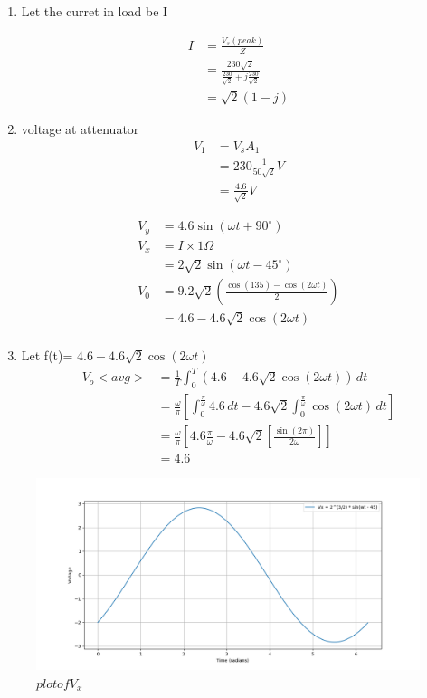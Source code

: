 \documentclass[journal,12pt,twocolumn]{IEEEtran}
\theoremstyle{remark}
\begin{document}

\begin{enumerate}
    \item 

Let the curret in load be I

\begin{center}
\begin{align}
     I &=\frac{V_s(peak)}{Z}\\
     &=\frac{230\sqrt{2}}{\frac{230}{\sqrt{2}}+j\frac{230}{\sqrt{2}}} \\
     &=\sqrt{2}(1-j)
\end{align}
\end{center}
\item
voltage at attenuator 
\begin{align}
    V_1&=V_sA_1\\
    &=230\frac{1}{50\sqrt{2}}V\\
    &=\frac{4.6}{\sqrt{2}}V
\end{align}

\begin{center}
    \begin{align}
        V_y&=4.6\sin(\omega t+90^\circ)\\
        V_x&=I\times 1\Omega\\
        &=2\sqrt{2}\sin(\omega t-45^\circ)\\
        V_0&=9.2\sqrt{2}(\frac{\cos(135)-\cos(2\omega t)}{2})\\
        &=4.6-4.6\sqrt{2}\cos(2\omega t)\\
    \end{align}
\end{center}

\item 
Let f(t)= $4.6-4.6\sqrt{2}\cos(2\omega t)$
\begin{align}
    V_o<avg>&=\frac{1}{T}\int_{0}^{T}(4.6-4.6\sqrt{2}\cos(2\omega t))\,dt\\
    &=\frac{\omega}{\pi} \left[\int_{0}^{\frac{\pi}{\omega}}4.6\,dt-4.6\sqrt{2}\int_{0}^{\frac{\pi}{\omega}}\cos(2\omega t)\,dt\right]\\
    &=\frac{\omega}{\pi}\left[4.6\frac{\pi}{\omega}-4.6\sqrt{2}\left[\frac{\sin(2\pi )}{2\omega}\right]\right]\\
    &=4.6
\end{align}
\end{enumerate}
\begin{figure}[h]
      \centering
       \includegraphics[width=1\linewidth]{figs/V_x.png} %
        \caption{$plot of V_x$}
\end{figure}
\end{document}
